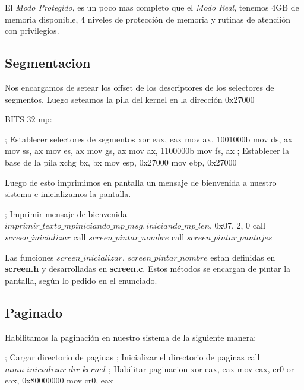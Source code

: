 El \textit{Modo Protegido}, es un poco mas completo que el \textit{Modo Real}, tenemos 4GB de memoria disponible, 4 niveles de protecci\'on de memoria y rutinas de atencii\'on con privilegios.

\subsection{Segmentacion}
Nos encargamos de setear los offset de los descriptores de los selectores de segmentos. Luego seteamos la pila del kernel en la direcci\'on 0x27000

\begin{algorithmic}
\State \tab BITS 32
\State \tab mp:

    \State \tab \tab ; Establecer selectores de segmentos
    \State \tab \tab xor eax, eax
    \State \tab \tab  mov ax, 1001000b
    \State \tab \tab  mov ds, ax
    \State \tab \tab  mov ss, ax
    \State \tab \tab  mov es, ax
    \State \tab \tab  mov gs, ax
    \State \tab \tab  mov ax, 1100000b
    \State \tab \tab  mov fs, ax
    \State \tab \tab  ; Establecer la base de la pila
    \State \tab \tab  xchg bx, bx
    \State \tab \tab  mov esp, 0x27000
    \State \tab \tab  mov ebp, 0x27000
\end{algorithmic}

Luego de esto imprimimos en pantalla un mensaje de bienvenida a nuestro sistema e inicializamos la pantalla.
\begin{algorithmic}
    \State \tab \tab ; Imprimir mensaje de bienvenida
    \State \tab \tab $imprimir\_texto\_mp iniciando\_mp\_msg, iniciando\_mp\_len$, 0x07, 2, 0
    \State \tab \tab call $screen\_inicializar$
    \State \tab \tab call $screen\_pintar\_nombre$
    \State \tab \tab call $screen\_pintar\_puntajes$
\end{algorithmic}

Las funciones \textit{$screen\_inicializar$}, \textit{$screen\_pintar\_nombre$} estan definidas en \textbf{screen.h} y desarrolladas en \textbf{screen.c}. Estos m\'etodos se encargan de pintar la pantalla, seg\'un lo pedido en el enunciado.

\subsection{Paginado}
Habilitamos la paginaci\'on en nuestro sistema de la siguiente manera:
\begin{algorithmic}
    \State \tab ; Cargar directorio de paginas
    \State \tab ; Inicializar el directorio de paginas
    \State \tab call $mmu\_inicializar\_dir\_kernel$
    \State \tab ; Habilitar paginacion
    \State \tab xor eax, eax
    \State \tab mov eax, cr0
    \State \tab or eax, 0x80000000
    \State \tab mov cr0, eax
\end{algorithmic}

